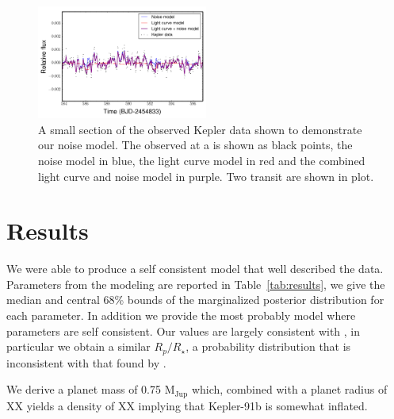 \documentclass[apjl]{emulateapj}
\begin{document}
\begin{figure}
\includegraphics[width=0.50\textwidth]{noisemodel.png}
\caption{A small section of the observed Kepler data shown to demonstrate our noise model. The observed at a is shown as black points, the noise model in blue, the light curve model in red and the combined light curve and noise model in purple. Two transit are shown in plot. }
\label{fig:filter}
\end{figure}


\section{Results}
We were able to produce a self consistent model that well described the data. Parameters from the modeling are reported in Table~\ref{tab:results}, we give the median and central 68\% bounds of the marginalized posterior distribution for each parameter. In addition we provide the most probably model where parameters are self consistent. Our values are largely consistent with \citet{lillo14}, in particular we obtain a similar $R_{p}/R_{\star}$, a probability distribution that is inconsistent with that found by \citet{sliski14}.

We derive a planet mass of 0.75 M$_{\textrm{Jup}}$ which, combined with a planet radius of XX yields a density of XX implying that Kepler-91b is somewhat inflated. 
\end{document}
